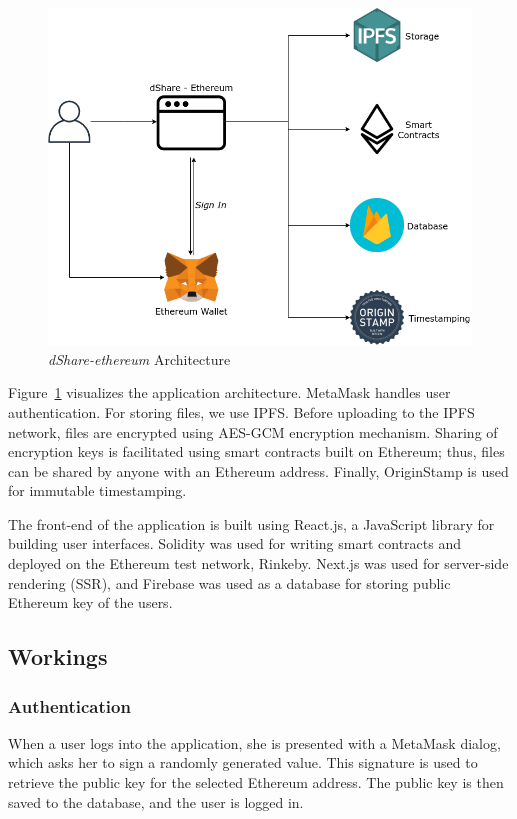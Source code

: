 \begin{figure}[h]
	\includegraphics[width=\linewidth]{figures/dshare-ethereum}
	\caption{\label{fig:dshare-ethereum} \textit{dShare-ethereum} Architecture}
\end{figure}

Figure~\ref{fig:dshare-ethereum} visualizes the application architecture. MetaMask handles user authentication. For storing files, we use IPFS. Before uploading to the IPFS network, files are encrypted using AES-GCM\cite{web:aesgcm:1} encryption mechanism. Sharing of encryption keys is facilitated using smart contracts built on Ethereum; thus, files can be shared by anyone with an Ethereum address. Finally, OriginStamp is used for immutable timestamping.

The front-end of the application is built using React.js\cite{web:react:1}, a JavaScript library for building user interfaces. Solidity was used for writing smart contracts and deployed on the Ethereum test network, Rinkeby\cite{web:rinkeby:1}. Next.js\cite{web:next:1} was used for server-side rendering (SSR), and Firebase was used as a database for storing public Ethereum key of the users.

\subsection{Workings}
\subsubsection{Authentication}
When a user logs into the application, she is presented with a MetaMask dialog, which asks her to sign a randomly generated value. This signature is used to retrieve the public key for the selected Ethereum address. The public key is then saved to the database, and the user is logged in.

